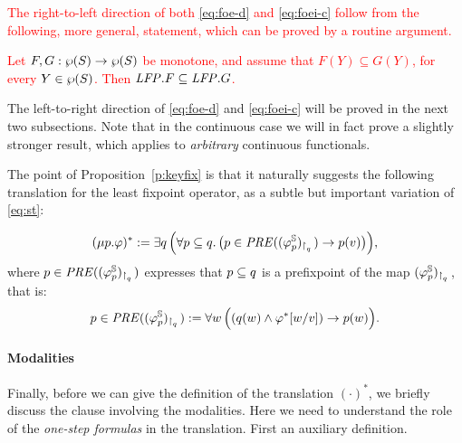 \textcolor{red}{
The right-to-left direction of both \eqref{eq:foe-d} and \eqref{eq:foei-c} 
follow from the following, more general, statement, which can be proved by a 
routine argument.
%
\begin{proposition}
\label{p:rstfix}
Let $F,G:  \wp(S)\to \wp(S)$ be monotone, and assume that 
$F(Y) \subseteq G(Y)$, for every $Y \in  \wp(S)$.
Then $\mathit{LFP}. F \subseteq \mathit{LFP}.G$.
\end{proposition}
}

%


The left-to-right direction of \eqref{eq:foe-d} and \eqref{eq:foei-c} 
will be proved in the next two subsections.
Note that in the continuous case we will in fact prove a slightly stronger
result, which applies to \emph{arbitrary} continuous functionals.

\newcommand{\PRE}{\mathit{PRE}}
The point of Proposition~\ref{p:keyfix} is that it naturally suggests the
following translation for the least fixpoint operator, as a subtle but important 
variation of \eqref{eq:st}:

\begin{equation}
\label{eq:trlmu}
(\mu p. \varphi)^{*} \df 
   \exists q\,\Big(\forall  p \sse q.\,
      \big(p \in \PRE((\varphi^{\bbS}_{p})_{\rst{q}}) \to p(v)\big)\Big),
\end{equation}
where $p \in \PRE((\varphi^{\bbS}_{p})_{\rst{q}})$ expresses that $p \subseteq q$ 
is a prefixpoint of the map $(\varphi^{\mathbb{S}}_{p})_{{\upharpoonright}_{q}\,}$, that is:
\[
p  \in \PRE((\varphi^{\bbS}_{p})_{\rst{q}}) \df
\forall w\, \Big(
( q(w) \land \varphi^{*}[w/v]) \to p(w)
\Big).
\]

\paragraph{Modalities}
Finally, before we can give the definition of the translation $(\cdot)^{*}$, we
briefly discuss the clause involving the modalities.
Here we need to understand the role of the \emph{one-step formulas} in the 
translation.
First an auxiliary definition.

